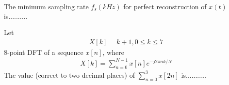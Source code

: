 The minimum sampling rate $f_s(kHz)$ for perfect reconstruction of $x(t)$ is..........

\item Let
\begin{align*}
X[k] = k + 1, 0 \leq k \leq 7
\end{align*}
8-point DFT of a sequence $x[n]$, where
\begin{align*}
X[k] = \sum_{n=0}^{N-1}x[n]e^{-j2\pi nk/N}
\end{align*}
The value (correct to two decimal places) of $\sum_{n=0}^{3}x[2n]$ is...........